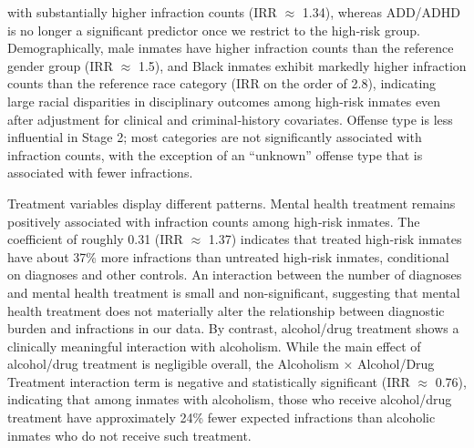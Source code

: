 \documentclass[
]{article}
\begin{document}
with substantially higher infraction counts (IRR \(\approx\) 1.34),
whereas ADD/ADHD is no longer a significant predictor once we restrict
to the high‑risk group. Demographically, male inmates have higher
infraction counts than the reference gender group (IRR \(\approx\) 1.5),
and Black inmates exhibit markedly higher infraction counts than the
reference race category (IRR on the order of 2.8), indicating large
racial disparities in disciplinary outcomes among high‑risk inmates even
after adjustment for clinical and criminal‑history covariates. Offense
type is less influential in Stage 2; most categories are not
significantly associated with infraction counts, with the exception of
an ``unknown'' offense type that is associated with fewer infractions.

Treatment variables display different patterns. Mental health treatment
remains positively associated with infraction counts among high‑risk
inmates. The coefficient of roughly 0.31 (IRR \(\approx\) 1.37)
indicates that treated high‑risk inmates have about 37\% more
infractions than untreated high‑risk inmates, conditional on diagnoses
and other controls. An interaction between the number of diagnoses and
mental health treatment is small and non-significant, suggesting that
mental health treatment does not materially alter the relationship
between diagnostic burden and infractions in our data. By contrast,
alcohol/drug treatment shows a clinically meaningful interaction with
alcoholism. While the main effect of alcohol/drug treatment is
negligible overall, the Alcoholism × Alcohol/Drug Treatment interaction
term is negative and statistically significant (IRR \(\approx\) 0.76),
indicating that among inmates with alcoholism, those who receive
alcohol/drug treatment have approximately 24\% fewer expected
infractions than alcoholic inmates who do not receive such treatment.
\end{document}

